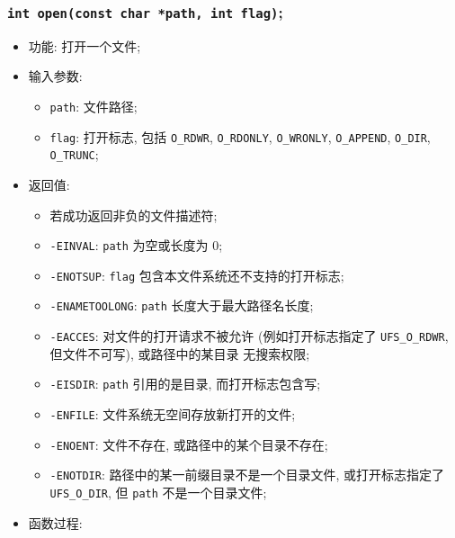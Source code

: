 \documentclass[nofonts]{ctexart}
\begin{document}
  \subsubsection{\texttt{int open(const char *path, int flag)};}
  \begin{itemize}
\item
  功能: 打开一个文件;
\item
  输入参数:

  \begin{itemize}
  \item
    \texttt{path}: 文件路径;
  \item
    \texttt{flag}: 打开标志, 包括 \texttt{O\_RDWR}, \texttt{O\_RDONLY},
    \texttt{O\_WRONLY}, \texttt{O\_APPEND}, \texttt{O\_DIR},
    \texttt{O\_TRUNC};
  \end{itemize}
\item
  返回值:

  \begin{itemize}
  \item
    若成功返回非负的文件描述符;
  \item
    \texttt{-EINVAL}: \texttt{path} 为空或长度为 0;
  \item
    \texttt{-ENOTSUP}: \texttt{flag} 包含本文件系统还不支持的打开标志;
  \item
    \texttt{-ENAMETOOLONG}: \texttt{path} 长度大于最大路径名长度;
  \item
    \texttt{-EACCES}: 对文件的打开请求不被允许 (例如打开标志指定了
    \texttt{UFS\_O\_RDWR}, 但文件不可写), 或路径中的某目录 无搜索权限;
  \item
    \texttt{-EISDIR}: \texttt{path} 引用的是目录, 而打开标志包含写;
  \item
    \texttt{-ENFILE}: 文件系统无空间存放新打开的文件;
  \item
    \texttt{-ENOENT}: 文件不存在, 或路径中的某个目录不存在;
  \item
    \texttt{-ENOTDIR}: 路径中的某一前缀目录不是一个目录文件,
    或打开标志指定了 \texttt{UFS\_O\_DIR}, 但 \texttt{path}
    不是一个目录文件;
  \end{itemize}
\item
  函数过程:


\end{itemize}
\end{document}

